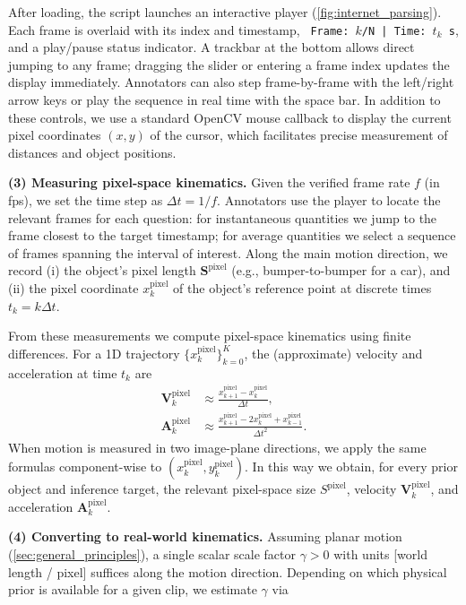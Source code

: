 After loading, the script launches an interactive player (\autoref{fig:internet_parsing}).
Each frame is overlaid with its index and timestamp, \texttt{ Frame: $k$/N | Time: $t_k$\,s}, and a play/pause status indicator.
A trackbar at the bottom allows direct jumping to any frame; dragging the slider or entering a frame index updates the display immediately.
Annotators can also step frame-by-frame with the left/right arrow keys or play the sequence in real time with the space bar.
In addition to these controls, we use a standard OpenCV mouse callback to display the current pixel coordinates $(x,y)$ of the cursor, which facilitates precise measurement of distances and object positions.


\noindent\textbf{(3) Measuring pixel-space kinematics.}
Given the verified frame rate $f$ (in fps), we set the time step as $\Delta t = 1/f$.
Annotators use the player to locate the relevant frames for each question:
for instantaneous quantities we jump to the frame closest to the target timestamp; for average quantities we select a sequence of frames spanning the interval of interest.
Along the main motion direction, we record
(i) the object’s pixel length $\mathbf S^{\mathrm{pixel}}$ (e.g., bumper-to-bumper for a car), and
(ii) the pixel coordinate $x_k^{\mathrm{pixel}}$ of the object’s reference point at discrete times
$t_k = k \Delta t$.

From these measurements we compute pixel-space kinematics using finite differences.
For a 1D trajectory $\{x_k^{\mathrm{pixel}}\}_{k=0}^{K}$, the (approximate) velocity and acceleration at time $t_k$ are
\begin{align*}
\mathbf V_k^{\mathrm{pixel}} 
  &\approx \frac{x_{k+1}^{\mathrm{pixel}} - x_{k}^{\mathrm{pixel}}}{\Delta t}, \\
\mathbf A_k^{\mathrm{pixel}} 
  &\approx \frac{x_{k+1}^{\mathrm{pixel}} - 2 x_{k}^{\mathrm{pixel}} + x_{k-1}^{\mathrm{pixel}}}{\Delta t^2}.
\end{align*}
When motion is measured in two image-plane directions, we apply the same formulas component-wise to $(x_k^{\mathrm{pixel}}, y_k^{\mathrm{pixel}})$.
In this way we obtain, for every prior object and inference target, the relevant pixel-space size $S^{\mathrm{pixel}}$, velocity $\mathbf V_k^{\mathrm{pixel}}$, and acceleration $\mathbf A_k^{\mathrm{pixel}}$.

\noindent\textbf{(4) Converting to real-world kinematics.}
Assuming planar motion (\autoref{sec:general_principles}), a single scalar scale factor $\gamma>0$ with units [world length / pixel] suffices along the motion direction.
Depending on which physical prior is available for a given clip, we estimate $\gamma$ via

